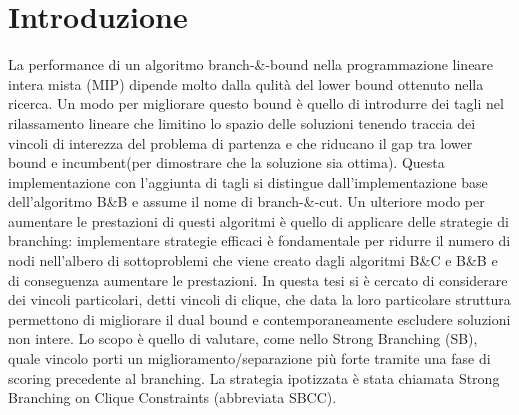 \documentclass[12pt,a4paper,twoside,openright]{book}
\begin{document}
\mainmatter

\chapter{Introduzione}
La performance di un algoritmo branch-\&-bound nella programmazione lineare intera mista (MIP)
dipende molto dalla qulità del lower bound ottenuto nella ricerca. Un modo per migliorare questo bound
è quello di introdurre dei tagli nel rilassamento lineare che limitino lo spazio delle soluzioni tenendo traccia
dei vincoli di interezza del problema di partenza e che riducano il gap tra lower bound e incumbent(per dimostrare che la soluzione sia ottima).
Questa implementazione con l'aggiunta di tagli si distingue dall'implementazione base dell'algoritmo B\&B e assume il nome di branch-\&-cut.
Un ulteriore modo per aumentare le prestazioni di questi algoritmi è quello di applicare delle strategie
di branching: implementare strategie efficaci è fondamentale per ridurre il numero di nodi nell'albero di sottoproblemi che viene creato 
dagli algoritmi B\&C e B\&B e di conseguenza aumentare le prestazioni.
In questa tesi si è cercato di considerare dei vincoli particolari, detti vincoli di clique,
che data la loro particolare struttura permettono di migliorare il dual bound e contemporaneamente escludere 
soluzioni non intere. Lo scopo è quello di valutare, come nello Strong Branching (SB), quale vincolo porti un 
miglioramento/separazione più forte tramite una fase di scoring precedente al branching. La strategia
ipotizzata è stata chiamata Strong Branching on Clique Constraints (abbreviata SBCC).
\end{document}
